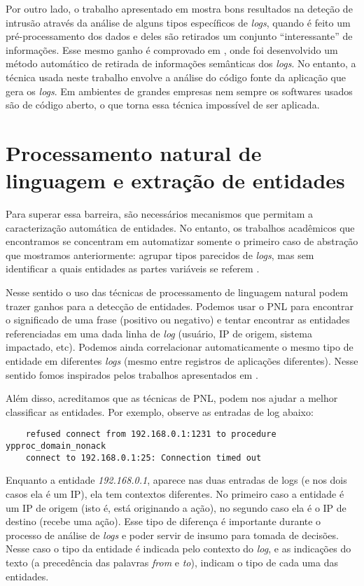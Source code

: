 \documentclass[
	12pt,				%
	openright,			%
	twoside,			%
	a4paper,			%
	english,			%
	spanish,			%
	brazil,				%
	]{abntex2}
\begin{document}
Por outro lado, o trabalho apresentado em \cite{yen2013beehive} mostra bons resultados na deteção de intrusão através da análise de alguns tipos específicos de \emph{logs}, quando é feito um pré-processamento dos dados e deles são retirados um conjunto ``interessante'' de informações. Esse mesmo ganho é comprovado em \cite{xu2009detecting}, onde foi desenvolvido um método automático de retirada de informações semânticas dos \emph{logs}. No entanto, a técnica usada neste trabalho envolve a análise do código fonte da aplicação que gera os \emph{logs}. Em ambientes de grandes empresas nem sempre os softwares usados são de código aberto, o que torna essa técnica impossível de ser aplicada.

\section{Processamento natural de linguagem e extração de entidades}
Para superar essa barreira, são necessários mecanismos que permitam a caracterização automática de entidades. No entanto, os trabalhos acadêmicos que encontramos se concentram em automatizar somente o primeiro caso de abstração que mostramos anteriormente: agrupar tipos parecidos de \emph{logs}, mas sem identificar a quais entidades as partes variáveis se referem \cite{vaarandi2003data, nagappan2010abstracting}.

Nesse sentido o uso das técnicas de processamento de linguagem natural podem trazer ganhos para a detecção de entidades. Podemos usar o PNL para encontrar o significado de uma frase (positivo ou negativo) e tentar encontrar as entidades referenciadas em uma dada linha de \emph{log} (usuário, IP de origem, sistema impactado, etc). Podemos ainda correlacionar automaticamente o mesmo tipo de entidade em diferentes \emph{logs} (mesmo entre registros de aplicações diferentes).  Nesse sentido fomos inspirados pelos trabalhos apresentados em \cite{matos2010environment, duque2012processo}.

Além disso, acreditamos que as técnicas de PNL, podem nos ajudar a melhor classificar as entidades. Por exemplo, observe as entradas de log abaixo:

{\tiny
	\begin{verbatim}
	refused connect from 192.168.0.1:1231 to procedure ypproc_domain_nonack 
	connect to 192.168.0.1:25: Connection timed out
	\end{verbatim}
}

Enquanto a entidade \emph{192.168.0.1}, aparece nas duas entradas de logs (e nos dois casos ela é um IP), ela tem contextos diferentes. No primeiro caso a entidade é um IP de origem (isto é, está originando a ação), no segundo caso ela é o IP de destino (recebe uma ação). Esse tipo de diferença é importante durante o processo de análise de \emph{logs} e poder servir de insumo para tomada de decisões. Nesse caso o tipo da entidade é indicada pelo contexto do \emph{log}, e as indicações do texto (a precedência das palavras \emph{from} e \emph{to}), indicam o tipo de cada uma das entidades.
\end{document}
